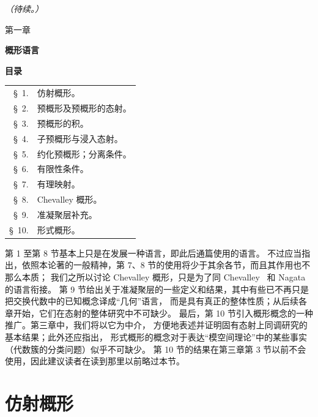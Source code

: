 \documentclass[UTF8,fontset=none,11pt,oneside,openany]{ctexbook}
\newcommand{\oldpage}[2][]{%
  \hypertarget{ega-source-page-#1-#2}{}%
  \marginnote{\scriptsize\textbf{#1}~|~#2}\ignorespaces}
\let\EGAOriginalLabel\label
\renewcommand{\label}[1]{\phantomsection\EGAOriginalLabel{#1}}
\begin{document}
\begin{flushright}
\emph{（待续。）}
\end{flushright}
\clearpage
\oldpage[I]{79}
\label{chapter:I-fr}

\begin{center}
{\large 第一章\par}
\vspace{1.5em}
{\Large\bfseries 概形语言\par}
\vspace{1.8em}
{\bfseries 目录\par}
\end{center}

\medskip
\begin{tabular}{@{}r@{\ }l@{}}
\S~1.  & 仿射概形。\\
\S~2.  & 预概形及预概形的态射。\\
\S~3.  & 预概形的积。\\
\S~4.  & 子预概形与浸入态射。\\
\S~5.  & 约化预概形；分离条件。\\
\S~6.  & 有限性条件。\\
\S~7.  & 有理映射。\\
\S~8.  & Chevalley 概形。\\
\S~9.  & 准凝聚层补充。\\
\S~10. & 形式概形。
\end{tabular}

\medskip
第 1 至第 8 节基本上只是在发展一种语言，即此后通篇使用的语言。
不过应当指出，依照本论著的一般精神，第 7、8 节的使用将少于其余各节，而且其作用也不那么本质；
我们之所以讨论 Chevalley 概形，只是为了同 Chevalley~\cite{I-1} 和 Nagata~\cite{I-9} 的语言衔接。
第 9 节给出关于准凝聚层的一些定义和结果，其中有些已不再只是把交换代数中的已知概念译成“几何”语言，
而是具有真正的整体性质；从后续各章开始，它们在态射的整体研究中不可缺少。
最后，第 10 节引入概形概念的一种推广。第三章中，我们将以它为中介，
方便地表述并证明固有态射上同调研究的基本结果；此外还应指出，
形式概形的概念对于表达“模空间理论”中的某些事实（代数簇的分类问题）似乎不可缺少。
第 10 节的结果在第三章第 3 节以前不会使用，因此建议读者在读到那里以前略过本节。

\clearpage

\setcounter{section}{0}
\section{仿射概形}
\label{section:I.1-fr}
\end{document}
